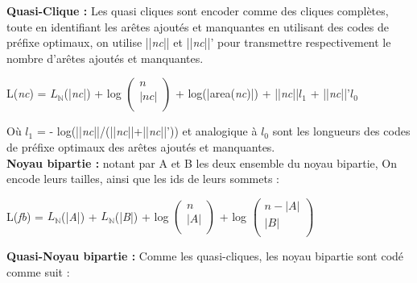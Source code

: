 \textbf{Quasi-Clique :} Les quasi cliques sont encoder comme des cliques complètes, toute en identifiant les arêtes ajoutés et manquantes en utilisant des codes de préfixe optimaux, on utilise ||\textit{nc}|| et ||\textit{nc}||' pour transmettre respectivement le nombre d'arêtes ajoutés et manquantes.  

\begin{center}
L(\textit{nc}) = $L_{\mathbb{N}}$(|\textit{nc}|) + log $\left( \begin{array}{c}
n \\
|\textit{nc}| \\
\end{array} \right)$ + log(|area(\textit{nc})|) + ||\textit{nc}||\textit{$l_{1}$} +  ||\textit{nc}||'\textit{$l_{0}$}\\
\end{center}
 
Où \textit{$l_{1}$} = - log(||\textit{nc}||/(||\textit{nc}||+||\textit{nc}||')) et analogique à \textit{$l_{0}$} sont les longueurs des codes de préfixe optimaux des arêtes  ajoutés et manquantes.\\
\textbf{Noyau bipartie :} notant par A et B les deux ensemble du noyau bipartie, On encode leurs tailles, ainsi que les ids de leurs sommets : 
 
\begin{center}
L(\textit{fb}) = $L_{\mathbb{N}}$(|\textit{A}|) + $L_{\mathbb{N}}$(|\textit{B}|) + log $\left( \begin{array}{c}
n \\
|\textit{A}| \\
\end{array} \right)$ + log $\left( \begin{array}{c}
n - |\textit{A}|\\
|\textit{B}| \\
\end{array} \right)$\\
\end{center}
\textbf{Quasi-Noyau bipartie :} Comme les quasi-cliques, les noyau bipartie sont codé comme suit :

